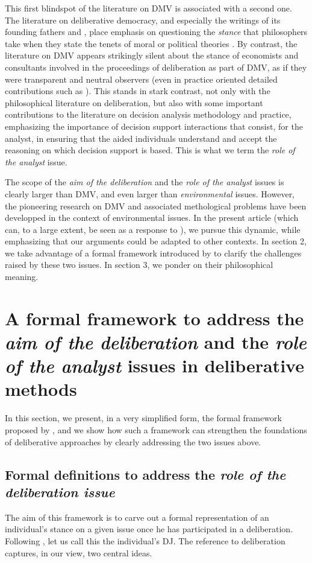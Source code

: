 \documentclass[version=3.21, pagesize, twoside=off, bibliography=totoc, DIV=calc, fontsize=12pt, a4paper, french, english]{scrartcl}
\begin{document}
This first blindspot of the literature on DMV is associated with a second one. The literature on deliberative democracy, and especially the writings of its founding fathers \citet{rawls_political_2005} and \citet{habermas_faktizitat_1992}, place emphasis on questioning the \emph{stance} that philosophers take when they state the tenets of moral or political theories \citep{meinard_du_2014}. 
By contrast, the literature on DMV appears strikingly silent about the stance of economists and consultants involved in the proceedings of deliberation as part of DMV, as if they were transparent and neutral observers (even in practice oriented detailed contributions such as \citet{schaafsma_guidance_2018}). 
This stands in stark contrast, not only with the philosophical literature on deliberation, but also with some important contributions to the literature on decision analysis methodology and practice, emphasizing the importance of decision support interactions that consist, for the analyst, in ensuring that the aided individuals understand and accept the reasoning on which decision support is based.
This is what we term the \emph{role of the analyst} issue.

The scope of the \emph{aim of the deliberation} and the \emph{role of the analyst} issues is clearly larger than DMV, and even larger than \emph{environmental} issues. 
However, the pioneering research on DMV and associated methological problems have been developped in the context of environmental issues. 
In the present article (which can, to a large extent, be seen as a response to \citet{bartkowski_beyond_2018}), we pursue this dynamic, while emphasizing that our arguments could be adapted to other contexts. In section 2, we take advantage of a formal framework introduced by \citet{cailloux_formal_2018} to clarify the challenges raised by these two issues.
In section 3, we ponder on their philosophical meaning.

\section{A formal framework to address the \emph{aim of the deliberation} and the \emph{role of the analyst} issues in deliberative methods}
In this section, we present, in a very simplified form, the formal framework proposed by \citet{cailloux_formal_2018}, and we show how such a framework can strengthen the foundations of deliberative approaches by clearly addressing the two issues above.

\subsection{Formal definitions to address the \emph{role of the deliberation issue}}
The aim of this framework is to carve out a formal representation of an individual's stance on a given issue once he has participated in a deliberation. 
Following \citet{cailloux_formal_2018}, let us call this the individual's \ac{DJ}. 
The reference to deliberation captures, in our view, two central ideas.
\end{document}
